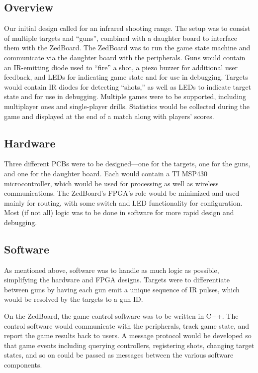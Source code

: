 \documentclass[oneside]{book}
\begin{document}
\subsection{Overview}

Our initial design called for an infrared shooting range.
The setup was to consist of multiple targets and ``guns'',
combined with a daughter board to interface them with the ZedBoard.
The ZedBoard was to run the game state machine and communicate via the daughter board
with the peripherals.
Guns would contain an IR-emitting diode used to ``fire'' a shot,
a piezo buzzer for additional user feedback,
and LEDs for indicating game state and for use in debugging.
Targets would contain IR diodes for detecting ``shots,''
as well as LEDs to indicate target state and for use in debugging.
Multiple games were to be supported,
including multiplayer ones and single-player drills.
Statistics would be collected during the game and displayed at the end of a match
along with players' scores.

\subsection{Hardware}

Three different PCBs were to be designed---one for the targets, one for the guns,
and one for the daughter board.
Each would contain a TI MSP430 microcontroller, which would be used for processing
as well as wireless communications.
The ZedBoard's FPGA's role would be minimized and used mainly for routing,
with some switch and LED functionality for configuration.
Most (if not all) logic was to be done in software for more rapid design and debugging.

\subsection{Software}

As mentioned above, software was to handle as much logic as possible,
simplifying the hardware and FPGA designs.
Targets were to differentiate between guns by having each gun emit a unique
sequence of IR pulses, which would be resolved by the targets to a gun ID.

On the ZedBoard, the game control software was to be written in C++.
The control software would communicate with the peripherals, track game state,
and report the game results back to users.
A message protocol would be developed so that game events including querying controllers,
registering shots, changing target states, and so on could be passed as messages
between the various software components.
\end{document}
